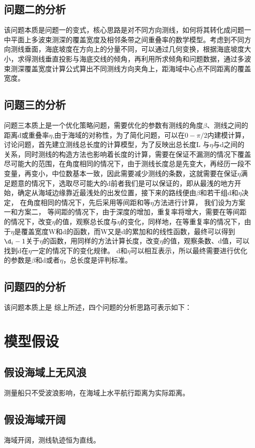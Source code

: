 \documentclass[withoutpreface,bwprint]{cumcmthesis} %
\begin{document}
\subsection{问题二的分析}
该问题本质是问题一的变式，核心思路是对不同方向测线，如何将其转化成问题一中平面上多波束测深的覆盖宽度及相邻条带之间重叠率的数学模型。考虑到不同方向测线垂面，海底坡度在方向上的分量不同，可以通过几何变换，根据海底坡度大小，求得测线垂直投影与海底交线的倾角，再利用所求倾角和问题数据，通过多波束测深覆盖宽度计算公式算出不同测线方向夹角上，距海域中心点不同距离的覆盖宽度。
\subsection{问题三的分析}  
问题三本质上是一个优化策略问题，需要优化的参数有测线的角度$\beta$、测线之间的距离d或重叠率$\eta$,由于海域的对称性，为了简化问题，可以在$0-\pi/2$内建模计算，讨论问题，首先建立测线总长度的计算模型，为了反映出总长度L
与$\eta$与d之间的关系，同时测线的构造方法也影响着长度的计算，需要在保证不漏测的情况下覆盖尽可能大的范围，在角度相同的情况下，由于测线长度总是先变大，再经历一段不变量，再变小，中位数基本一致，因此需要减少测线的条数，这就需要在保证$\eta$满足题意的情况下，选取尽可能大的d前者我们是可以保证的，即从最浅的地方开始，确定从海域边缘靠近最浅处的出发位置，接下来的路线便由$\beta$和若干组d和$\eta$决定，
在角度相同的情况下，先后采用等间距和等$\eta$方法进行计算，
我们设为方案一和方案二，
等间距的情况下，由于深度的增加，重复率将增大，需要在等间距的情况下，改变$\eta$的值，观察总长度与$\eta$的变化，同样地，在等重复率的情况下，由于$\eta$是覆盖宽度W和d的函数，而W又是d的累加和的线性函数，最终可以得到$\d_i-1$关于$\eta$的函数，用同样的方法计算长度，改变$\eta$的值，观察条数、d值，可以找到d在$\eta$一定的情况下的变化规律。
d和$\eta$可以相互表示，所以最终需要进行优化的参数是$\beta$和d或者$\eta$，总长度是评判标准。
\subsection{问题四的分析}
该问题本质上是
综上所述，四个问题的分析思路可表示如下：
\section{模型假设}
\subsection{假设海域上无风浪}
测量船只不受波浪影响，在海域上水平航行距离为实际距离。
\subsection{假设海域开阔}
海域开阔，测线轨迹恒为直线。
\end{document}
